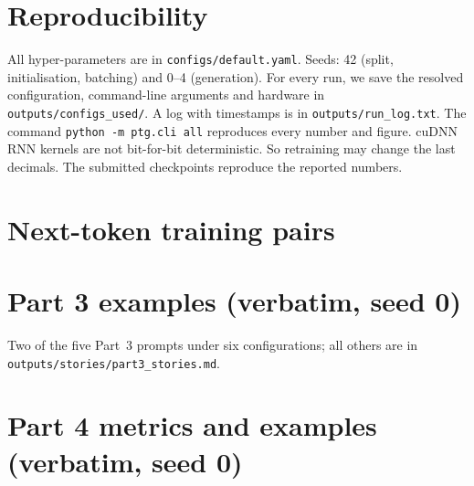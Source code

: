 \documentclass[11pt,a4paper]{article}
\begin{document}
\section{Reproducibility}
All hyper-parameters are in \texttt{configs/default.yaml}. Seeds: 42 (split, initialisation,
batching) and 0--4 (generation). For every run, we save the resolved configuration, command-line
arguments and hardware in \texttt{outputs/configs\_used/}. A log with timestamps is in
\texttt{outputs/run\_log.txt}. The command \texttt{python -m ptg.cli all} reproduces every number
and figure. cuDNN RNN kernels are not bit-for-bit deterministic. So retraining may change the last
decimals. The submitted checkpoints reproduce the reported numbers.
\appendix
\section{Next-token training pairs}\label{app:pairs}
\begin{small}

\end{small}

\section{Part 3 examples (verbatim, seed 0)}\label{app:p3}
Two of the five Part~3 prompts under six configurations; all others are in
\texttt{outputs/stories/part3\_stories.md}.


\section{Part 4 metrics and examples (verbatim, seed 0)}\label{app:p4tab}
\begin{table}[H]\centering
\caption{Automatic metrics on the five Plot-Twist openings only.}
{\scriptsize\resizebox{\linewidth}{!}{}}
\end{table}

\end{document}
